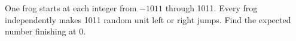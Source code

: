 One frog starts at each integer from $-1011$ through 1011. Every frog independently makes 1011 random unit left or right jumps. Find the expected number finishing at 0.
